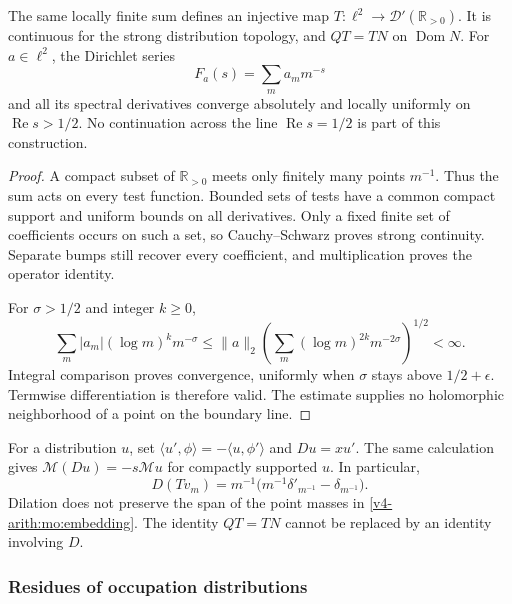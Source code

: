 \begin{proposition}
\label{v4-arith:mo:dirichlet-domain}
The same locally finite sum defines an injective map
$T:\ell^2\to\mathscr D'(\mathbb R_{>0})$. It is continuous for
the strong distribution topology, and $QT=TN$ on
$\operatorname{Dom}N$. For $a\in\ell^2$, the Dirichlet series
\[
 F_a(s)=\sum_m a_m m^{-s}
\]
and all its spectral derivatives converge absolutely and locally
uniformly on $\operatorname{Re}s>1/2$. No continuation across the
line $\operatorname{Re}s=1/2$ is part of this construction.
\end{proposition}
\begin{proof}
A compact subset of $\mathbb R_{>0}$ meets only finitely many points
$m^{-1}$. Thus the sum acts on every test function. Bounded sets
of tests have a common compact support and uniform bounds on all
derivatives. Only a fixed finite set of coefficients occurs on such
a set, so Cauchy--Schwarz proves strong continuity. Separate bumps
still recover every coefficient, and multiplication proves the
operator identity.

For $\sigma>1/2$ and integer $k\geq0$,
\[
 \sum_m |a_m|(\log m)^k m^{-\sigma}
 \leq\|a\|_2
 \left(\sum_m(\log m)^{2k}m^{-2\sigma}\right)^{1/2}<\infty.
\]
Integral comparison proves convergence, uniformly when $\sigma$
stays above $1/2+\epsilon$. Termwise differentiation is therefore
valid. The estimate supplies no holomorphic neighborhood of a
point on the boundary line.
\end{proof}

For a distribution $u$, set $\langle u',\phi\rangle=-\langle
u,\phi'\rangle$ and $Du=xu'$. The same calculation gives
$\mathcal M(Du)=-s\mathcal Mu$ for compactly supported $u$.
In particular,
\[
 D(Tv_m)=m^{-1}\bigl(m^{-1}\delta'_{m^{-1}}-\delta_{m^{-1}}\bigr).
\]
Dilation does not preserve the span of the point masses in
\eqref{v4-arith:mo:embedding}. The identity $QT=TN$ cannot be replaced by
an identity involving $D$.

\subsubsection{Residues of occupation distributions}

